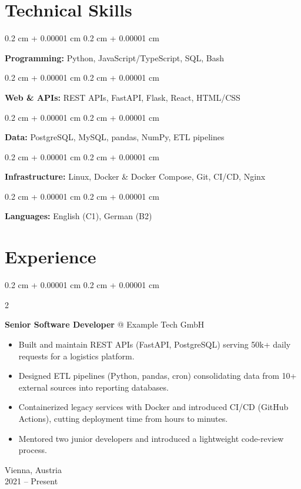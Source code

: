 \documentclass[10pt, letterpaper]{article}
\newenvironment{highlights}{
    \begin{itemize}[
        topsep=0.10 cm,
        parsep=0.10 cm,
        partopsep=0pt,
        itemsep=0pt,
        leftmargin=0.4 cm + 10pt
    ]
}{
    \end{itemize}
}
\newenvironment{onecolentry}{
    \begin{adjustwidth}{
        0.2 cm + 0.00001 cm
    }{
        0.2 cm + 0.00001 cm
    }
}{
    \end{adjustwidth}
}
\newenvironment{twocolentry}[2][]{
    \onecolentry
    \def\secondColumn{#2}
    \setcolumnwidth{\fill, 4.5 cm}
    \begin{paracol}{2}
}{
    \switchcolumn \raggedleft \secondColumn
    \end{paracol}
    \endonecolentry
}
\begin{document}
    \section{Technical Skills}
        \begin{onecolentry}
            \textbf{Programming:} Python, JavaScript/TypeScript, SQL, Bash
        \end{onecolentry}
        \begin{onecolentry}
            \textbf{Web \& APIs:} REST APIs, FastAPI, Flask, React, HTML/CSS
        \end{onecolentry}
        \begin{onecolentry}
            \textbf{Data:} PostgreSQL, MySQL, pandas, NumPy, ETL pipelines
        \end{onecolentry}
        \begin{onecolentry}
            \textbf{Infrastructure:} Linux, Docker \& Docker Compose, Git, CI/CD, Nginx
        \end{onecolentry}
        \begin{onecolentry}
            \textbf{Languages:} English (C1), German (B2)
        \end{onecolentry}

    \section{Experience}

        \begin{twocolentry}{
            Vienna, Austria \\
            2021 -- Present
        }
            \textbf{Senior Software Developer} @ Example Tech GmbH
            \begin{highlights}
                \item Built and maintain REST APIs (FastAPI, PostgreSQL) serving 50k+ daily requests for a logistics platform.
                \item Designed ETL pipelines (Python, pandas, cron) consolidating data from 10+ external sources into reporting databases.
                \item Containerized legacy services with Docker and introduced CI/CD (GitHub Actions), cutting deployment time from hours to minutes.
                \item Mentored two junior developers and introduced a lightweight code-review process.
            \end{highlights}
        \end{twocolentry}
\end{document}
